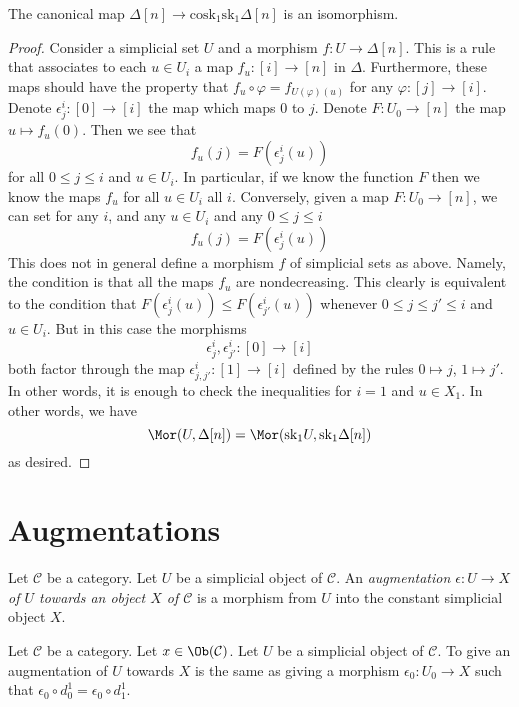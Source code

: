 \begin{lemma}
\label{lemma-simplex-cosk}
The canonical map
$\Delta[n] \to \text{cosk}_1 \text{sk}_1 \Delta[n]$
is an isomorphism.
\end{lemma}

\begin{proof}
Consider a simplicial set $U$ and a morphism
$f : U \to \Delta[n]$. This is a rule that associates
to each $u \in U_i$ a map $f_u : [i] \to [n]$ in $\Delta$.
Furthermore, these maps should have the property that
$f_u \circ \varphi = f_{U(\varphi)(u)}$ for any
$\varphi : [j] \to [i]$. Denote $\epsilon^i_j : [0] \to [i]$
the map which maps $0$ to $j$. Denote $F : U_0 \to [n]$
the map $u \mapsto f_u(0)$. Then we see that
$$
f_u(j) = F(\epsilon^i_j(u))
$$
for all $0 \leq j \leq i$ and $u \in U_i$.
In particular, if we know the function $F$
then we know the maps $f_u$ for all $u\in U_i$ all $i$.
Conversely, given a map $F : U_0 \to [n]$,
we can set for any $i$, and any $u \in U_i$
and any $0 \leq j \leq i$
$$
f_u(j) = F(\epsilon^i_j(u))
$$
This does not in general define a morphism $f$ of simplicial sets
as above. Namely, the condition is that all the maps $f_u$ are
nondecreasing. This clearly is equivalent to the condition
that $F(\epsilon^i_j(u)) \leq F(\epsilon^i_{j'}(u))$
whenever $0 \leq j \leq j' \leq i$ and $u \in U_i$. But in this
case the morphisms
$$
\epsilon^i_j, \epsilon^i_{j'} : [0] \to [i]
$$
both factor through the map
$\epsilon^i_{j, j'} : [1] \to [i]$ defined by the rules
$0 \mapsto j$, $1 \mapsto j'$.
In other words, it is enough to check the inequalities for
$i = 1$ and $u \in X_1$. In other words, we have
$$
\Mor(U, \Delta[n])
=
\Mor(\text{sk}_1 U, \text{sk}_1 \Delta[n])
$$
as desired.
\end{proof}



\section{Augmentations}
\label{section-augmentation}

\begin{definition}
\label{definition-augmentation}
Let $\mathcal{C}$ be a category.
Let $U$ be a simplicial object of $\mathcal{C}$.
An {\it augmentation $\epsilon : U \to X$ of
$U$ towards an object $X$ of $\mathcal{C}$}
is a morphism from $U$ into the constant simplicial
object $X$.
\end{definition}

\begin{lemma}
\label{lemma-augmentation-howto}
Let $\mathcal{C}$ be a category.
Let $x \in \Ob(\mathcal{C})$.
Let $U$ be a simplicial object of $\mathcal{C}$.
To give an augmentation of $U$ towards $X$ is
the same as giving a morphism $\epsilon_0 : U_0 \to X$
such that $\epsilon_0 \circ d^1_0 = \epsilon_0 \circ d^1_1$.
\end{lemma}

